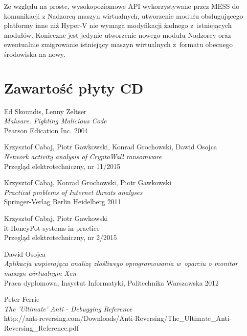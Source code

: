 \documentclass[a4paper,12pt,oneside]{article}
\begin{document}
	Ze względu na proste, wysokopoziomowe API wykorzystywane przez MESS do komunikacji z Nadzorcą maszyn wirtualnych, utworzenie modułu obsługującego platformy inne niż Hyper-V nie wymaga modyfikacji żadnego z~istniejących modułów. Konieczne jest jedynie utworzenie nowego modułu Nadzorcy oraz ewentualnie zmigrowanie istniejący maszyn wirtualnych z~formatu obecnego środowiska na nowy.		
	
	\clearpage
	\newpage	
	
	\section{Zawartość płyty CD}
	
	\clearpage
	\newpage
	
	\begin{thebibliography}{99}
	
	 Ed Skoundis, Lenny Zeltser \\
		{\it Malware. Fighting Malicious Code} \\
		Pearson Edication Inc. 2004
	
	 Krzysztof Cabaj, Piotr Gawkowski, Konrad Grochowski, Dawid Osojca \\ {\it Network activity analysis of CryptoWall ransomware}\\
		Przegląd elektrotechniczny, nr 11/2015				
	
	 Krzysztof Cabaj, Konrad Grochowski, Piotr Gawkowski \\
		{\it Practical problems of Internet threats analyses} \\
		Springer-Verlag Berlin Heidelberg 2011
		
	 Krzysztof Cabaj, Piotr Gawkowski \\
		{it HoneyPot systems in practice} \\
		Przegląd elektrotechniczny, nr 2/2015
		
	 Dawid Osojca \\ {\it Aplikacja wspierająca analizę złośliwego oprogramowania w~oparciu o monitor maszyn wirtualnym Xen } \\ Praca dyplomowa, Insystut Informatyki, Politechnika Warszawska 2012
	
	 Peter Ferrie \\
		{\it The 'Ultimate' Anti - Debugging Reference} \\
		http://anti-reversing.com/Downloads/Anti-Reversing/The\_Ultimate\_Anti-Reversing\_Reference.pdf
	

\end{thebibliography}
\end{document}
